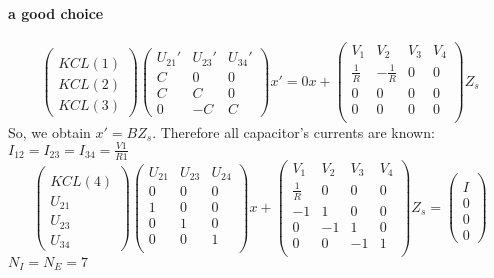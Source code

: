 \documentclass[10pt]{article}
\begin{document}
\paragraph{a good choice}
\[\left(\begin{array}{c}
  \\
KCL(1)\\KCL(2)\\KCL(3)
\end{array}\right)
\left(\begin{array}{ccc}
  U_{21}'&U_{23}'&U_{34}'\\
  \hline
  C&0&0\\
  C&C&0\\
  0&-C&C
\end{array}\right)x'=0x+
\left(\begin{array}{cccc}
  V_{1}&V_{2}&V_{3}&V_{4}\\
  \hline
  \frac{1}{R}&-\frac{1}{R}&0&0\\
  0&0&0&0\\
  0&0&0&0\\
\end{array}\right)Z_{s}
 \]
 So, we obtain $x'=BZ_{s}$. Therefore all capacitor's currents are known: $I_{12}=I_{23}=I_{34}=\frac{V1}{R1}$\\
 \[\left(\begin{array}{c}
  \\
KCL(4)\\U_{21}\\U_{23}\\U_{34}
\end{array}\right)
 \left(\begin{array}{ccc}
  U_{21}&U_{23}&U_{24}\\
  \hline
  0&0&0\\
  1&0&0\\
  0&1&0\\
  0&0&1\\
\end{array}\right)x+
 \left(\begin{array}{cccc}
  V_{1}&V_{2}&V_{3}&V_{4}\\
  \hline
  \frac{1}{R}&0&0&0\\
  -1&1&0&0\\
  0&-1&1&0\\
  0&0&-1&1\\
\end{array}\right)Z_{s}=
 \left(\begin{array}{c}
  \\I\\0\\0\\0
\end{array}\right)
 \]
$N_{I}=N_{E}=7$\\
 \newpage
\end{document}
